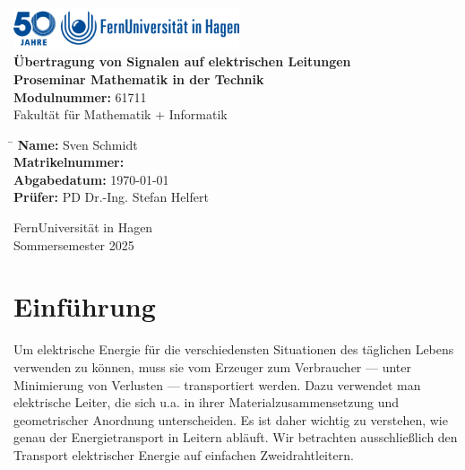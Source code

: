\documentclass[paper=a4, parskip=half-, ngerman, fontsize=11pt]{scrreprt}
\begin{document}
\begin{titlepage}
    \begin{center}
        \includegraphics[width=0.5\textwidth]{logo_fernuni_hagen.png}\\[2cm]

        {\LARGE \textbf{Übertragung von Signalen auf elektrischen Leitungen}}\\[2cm]

        \textbf{Proseminar Mathematik in der Technik}\\
        \textbf{Modulnummer:} 61711\\
        Fakultät für Mathematik + Informatik\\[0.5cm]

        \begin{tabbing}
            \hspace{6cm} \= \kill
            \textbf{Name:} \> Sven Schmidt \\
            \textbf{Matrikelnummer:}  \\
            \textbf{Abgabedatum:} \> \today \\
            \textbf{Prüfer:} \> PD Dr.-Ing. Stefan Helfert \\
        \end{tabbing}

        \vfill

        {\large FernUniversität in Hagen}\\
        {\large Sommersemester 2025}
    \end{center}
\end{titlepage}

\chapter{Einführung}
Um elektrische Energie für die verschiedensten Situationen des täglichen Lebens verwenden zu können, muss sie vom
Erzeuger zum Verbraucher --- unter Minimierung von Verlusten --- transportiert werden. Dazu verwendet man elektrische
Leiter, die sich u.a. in ihrer Materialzusammensetzung und geometrischer Anordnung unterscheiden. Es ist daher wichtig
zu verstehen, wie genau der Energietransport in Leitern abläuft. Wir betrachten ausschließlich den Transport
elektrischer Energie auf einfachen Zweidrahtleitern.
\end{document}
